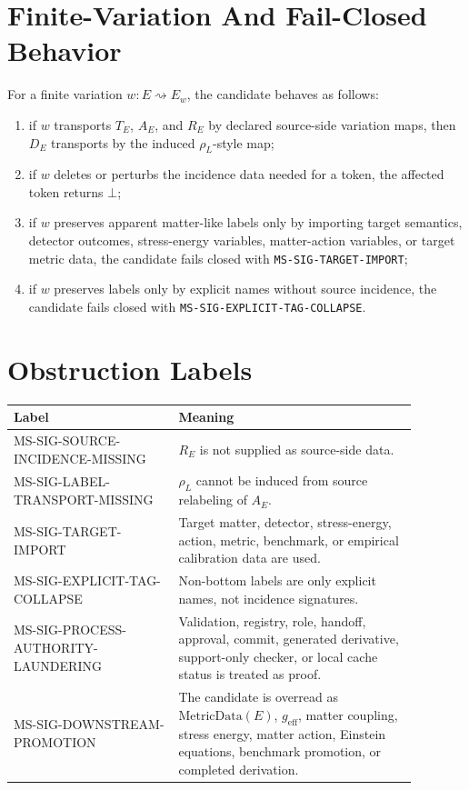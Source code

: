 \documentclass[11pt]{article}
\newcommand{\MetricData}{\mathrm{MetricData}}
\newcommand{\geff}{g_{\mathrm{eff}}}
\newcommand{\Bottom}{\bot}
\begin{document}
\section{Finite-Variation And Fail-Closed Behavior}

For a finite variation \(w:E\rightsquigarrow E_w\), the candidate behaves as
follows:
\begin{enumerate}[leftmargin=*]
\item if \(w\) transports \(T_E\), \(A_E\), and \(R_E\) by declared
  source-side variation maps, then \(D_E\) transports by the induced
  \(\rho_L\)-style map;
\item if \(w\) deletes or perturbs the incidence data needed for a token, the
  affected token returns \(\Bottom\);
\item if \(w\) preserves apparent matter-like labels only by importing target
  semantics, detector outcomes, stress-energy variables, matter-action
  variables, or target metric data, the candidate fails closed with
  \texttt{MS-SIG-TARGET-IMPORT};
\item if \(w\) preserves labels only by explicit names without source
  incidence, the candidate fails closed with
  \texttt{MS-SIG-EXPLICIT-TAG-COLLAPSE}.
\end{enumerate}

\section{Obstruction Labels}

\begin{longtable}{p{0.36\linewidth}p{0.52\linewidth}}
\toprule
Label & Meaning \\
\midrule
MS-SIG-SOURCE-INCIDENCE-MISSING & \(R_E\) is not supplied as source-side data. \\
MS-SIG-LABEL-TRANSPORT-MISSING & \(\rho_L\) cannot be induced from source relabeling of \(A_E\). \\
MS-SIG-TARGET-IMPORT & Target matter, detector, stress-energy, action, metric, benchmark, or empirical calibration data are used. \\
MS-SIG-EXPLICIT-TAG-COLLAPSE & Non-bottom labels are only explicit names, not incidence signatures. \\
MS-SIG-PROCESS-AUTHORITY-LAUNDERING & Validation, registry, role, handoff, approval, commit, generated derivative, support-only checker, or local cache status is treated as proof. \\
MS-SIG-DOWNSTREAM-PROMOTION & The candidate is overread as \(\MetricData(E)\), \(\geff\), matter coupling, stress energy, matter action, Einstein equations, benchmark promotion, or completed derivation. \\
\bottomrule
\end{longtable}
\end{document}
